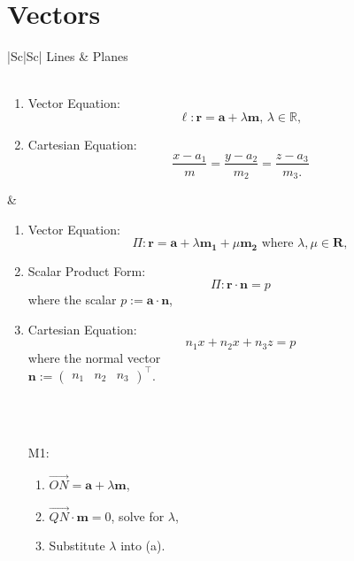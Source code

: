 \documentclass[oneside]{book}
\begin{document}
\chapter{Vectors}
\begin{longtable}{|Sc|Sc|}
  \hline
  Lines & Planes\\
  \hline
  \\
  \hline
  \begin{minipage}{0.5\textwidth}
    \begin{enumerate}
      \item Vector Equation: \[\ell \colon \mathbf{r}=\mathbf{a}+\lambda \mathbf{m}\text{, }\lambda \in \mathbb{R},\]
      \item Cartesian Equation: 
      \[\frac{x-a_1}{m}=\frac{y-a_2}{m_2}=\frac{z-a_3}{m_3.}\]
    \end{enumerate}
\end{minipage} & 
\begin{minipage}{0.5\textwidth}
\begin{enumerate}
  \item Vector Equation: 
  \[\Pi \colon \mathbf{r}=\mathbf{a}+\lambda
  \mathbf{m_1}+\mu \mathbf{m_2}\text{ where }\lambda,\mu\in\mathbf{R},\]
  \item Scalar Product Form: 
  \[\Pi \colon \mathbf{r} \cdot \mathbf{n}=p\]
  where the scalar \(p:= \mathbf{a}\cdot \mathbf{n}\),
  \item Cartesian Equation:
  \[n_1x+n_2x+n_3z=p\]
  where the normal vector\\
  \(\mathbf{n}:=\begin{pmatrix}
    n_1 & n_2 & n_3
  \end{pmatrix}^\top\).
\end{enumerate}
\end{minipage}\\
\hline
{}\\
\hline
\begin{minipage}{0.5\textwidth}
  \begin{enumerate}
    \item[M1:] 
    \begin{enumerate}
      \item \(\overrightarrow{ON}=\mathbf{a}+\lambda \mathbf{m}\),
      \item \(\overrightarrow{QN} \cdot \mathbf{m}=0\), solve for \(\lambda\),
      \item Substitute \(\lambda\) into (a).
    \end{enumerate}

\end{enumerate}
\end{minipage}
\end{longtable}
\end{document}
